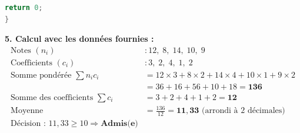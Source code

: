 \documentclass[11pt]{article}
\begin{document}
\begin{corrige}
\begin{lstlisting}[language=C]
    return 0;
}
\end{lstlisting}

\textbf{5. Calcul avec les données fournies :}
\begin{align*}
\text{Notes } (n_i) & : 12,\; 8,\; 14,\; 10,\; 9 \\
\text{Coefficients } (c_i) & : 3,\; 2,\; 4,\; 1,\; 2 \\[4pt]
\text{Somme pondérée } \sum n_i c_i & = 12\times3 + 8\times2 + 14\times4 + 10\times1 + 9\times2 \\
& = 36 + 16 + 56 + 10 + 18 = \mathbf{136} \\[4pt]
\text{Somme des coefficients } \sum c_i & = 3 + 2 + 4 + 1 + 2 = \mathbf{12} \\[4pt]
\text{Moyenne } & = \frac{136}{12} = \mathbf{11,33} \text{ (arrondi à 2 décimales)} \\[4pt]
\text{Décision : } 11,33 \ge 10 \Rightarrow \textbf{Admis(e)}
\end{align*}
\end{corrige}
\end{document}
